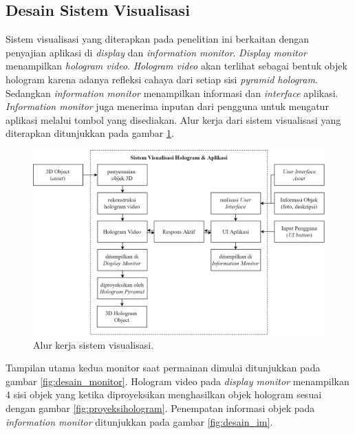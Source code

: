 	\subsection{Desain Sistem Visualisasi}
	\vspace{1ex}
		Sistem visualisasi yang diterapkan pada penelitian ini berkaitan dengan penyajian aplikasi di \textit{display} dan \textit{information monitor}. \textit{Display monitor} menampilkan \textit{hologram video}. \textit{Hologram video} akan terlihat sebagai bentuk objek hologram karena adanya refleksi cahaya dari setiap sisi \textit{pyramid hologram}. Sedangkan \textit{information monitor} menampilkan informasi dan \textit{interface} aplikasi. \textit{Information monitor} juga menerima inputan dari pengguna untuk mengatur aplikasi melalui tombol yang disediakan. Alur kerja dari sistem visualisasi yang diterapkan ditunjukkan pada gambar \ref{fig:desain_visualisasi}.
		\begin{figure} [H]
			\includegraphics[width=\textwidth]{img/bab3/desain_visualisasi.png}
			\caption{Alur kerja sistem visualisasi.}
			\label{fig:desain_visualisasi}
		\end{figure}
		\vspace{-2ex}
		
		Tampilan utama kedua monitor saat permainan dimulai ditunjukkan pada gambar \ref{fig:desain_monitor}. Hologram video pada \textit{display monitor} menampilkan 4 sisi objek yang ketika diproyeksikan menghasilkan objek hologram sesuai dengan gambar \ref{fig:proyeksihologram}. Penempatan informasi objek pada \textit{information monitor} ditunjukkan pada gambar \ref{fig:desain_im}.
		
